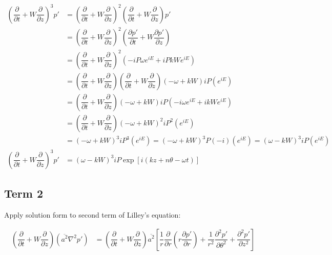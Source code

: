 \documentclass[]{aiaa-tc}%
\begin{document}
\begin{equation}
\begin{split}
\left( \dfrac{\partial}{\partial t} + W \dfrac{\partial}{\partial z} \right)^3 p'
&= \left( \dfrac{\partial}{\partial t} + W \dfrac{\partial}{\partial z}
   \right)^2
   \left( \dfrac{\partial}{\partial t} + W \dfrac{\partial}{\partial z}
   \right)p' \\
&= \left( \dfrac{\partial}{\partial t} + W \dfrac{\partial}{\partial z}
   \right)^2
   \left( \dfrac{\partial p'}{\partial t} + W \dfrac{\partial p'}{\partial z}
   \right) \\
&= \left( \dfrac{\partial}{\partial t} + W \dfrac{\partial}{\partial z}
   \right)^2
   \left( -iP\omega e^{iE} + iPkW e^{iE}
   \right) \\
&= \left( \dfrac{\partial}{\partial t} + W \dfrac{\partial}{\partial z}
   \right)
   \left( \dfrac{\partial}{\partial t} + W \dfrac{\partial}{\partial z}
   \right) (-\omega + kW)iP (e^{iE}) \\
&= \left( \dfrac{\partial}{\partial t} + W \dfrac{\partial}{\partial z}
   \right) (-\omega + kW)iP
   (-i\omega e^{iE} + ikW e^{iE}) \\
&= \left( \dfrac{\partial}{\partial t} + W \dfrac{\partial}{\partial z}
   \right) (-\omega + kW)^2iP^2 (e^{iE}) \\
&= (-\omega + kW)^3iP^3 (e^{iE}) = (-\omega + kW)^3P(-i) (e^{iE}) = (\omega - kW)^3iP (e^{iE}) \\
\left( \dfrac{\partial}{\partial t} + W \dfrac{\partial}{\partial z} \right)^3 p'
&= \boxed{(\omega - kW)^3iP \exp[i(kz + n\theta -\omega t)]}
\end{split}
\end{equation}


\subsection{Term 2}

Apply solution form to second term of Lilley's equation:


\begin{equation}
\begin{split}
\left( \dfrac{\partial}{\partial t} + W \dfrac{\partial}{\partial z} \right) (\overline{a^2}\nabla^2p')
&= \left( \dfrac{\partial}{\partial t} + W \dfrac{\partial}{\partial z}
   \right) \overline{a^2}
   \left[\dfrac{1}{r}\dfrac{\partial}{\partial r} \left( r\dfrac{\partial p'}{\partial r} \right)
      + \dfrac{1}{r^2} \dfrac{\partial^2 p'}{\partial \theta^2}
      + \dfrac{\partial^2 p'}{\partial z^2} \right] \\
\end{split}
\end{equation}
\end{document}

